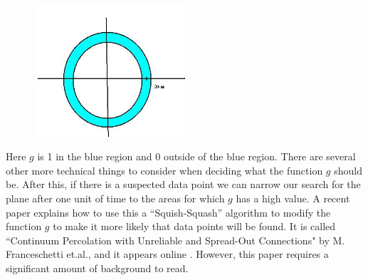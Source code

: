 	\begin{figure}[H]
	\centering
	\includegraphics[width=0.5\textwidth]{../sections/seasons/season1/112/images/squish.jpg} 
	\end{figure}


Here $g$ is 1 in the blue region and 0 outside of the blue region. There are several other more technical things to consider when deciding what the function $g$ should be. After this, if there is a suspected data point we can narrow our search for the plane after one unit of time to the areas for which $g$ has a high value. A recent paper explains how to use this a ``Squish-Squash'' algorithm to modify the function $g$ to make it more likely that data points will be found. It is called ``Continuum Percolation with Unreliable and Spread-Out Connections" by M. Franceschetti et.al., and it appears online . However, this paper requires a significant amount of background to read.